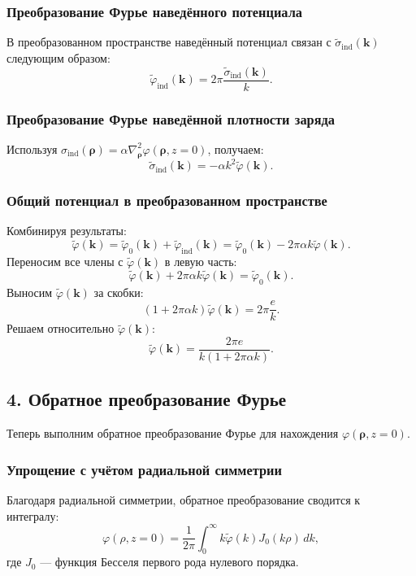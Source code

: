 \documentclass{article}
\begin{document}
\subsubsection*{Преобразование Фурье наведённого потенциала}

В преобразованном пространстве наведённый потенциал связан с \( \tilde{\sigma}_{\text{ind}}(\bm{k}) \) следующим образом:
\[
\tilde{\varphi}_{\text{ind}}(\bm{k}) = 2\pi \frac{\tilde{\sigma}_{\text{ind}}(\bm{k})}{k}.
\]

\subsubsection*{Преобразование Фурье наведённой плотности заряда}

Используя \( \sigma_{\text{ind}}(\bm{\rho}) = \alpha \nabla_{\bm{\rho}}^2 \varphi(\bm{\rho}, z = 0) \), получаем:
\[
\tilde{\sigma}_{\text{ind}}(\bm{k}) = -\alpha k^2 \tilde{\varphi}(\bm{k}).
\]

\subsubsection*{Общий потенциал в преобразованном пространстве}

Комбинируя результаты:
\[
\tilde{\varphi}(\bm{k}) = \tilde{\varphi}_0(\bm{k}) + \tilde{\varphi}_{\text{ind}}(\bm{k}) = \tilde{\varphi}_0(\bm{k}) - 2\pi \alpha k \tilde{\varphi}(\bm{k}).
\]
Переносим все члены с \( \tilde{\varphi}(\bm{k}) \) в левую часть:
\[
\tilde{\varphi}(\bm{k}) + 2\pi \alpha k \tilde{\varphi}(\bm{k}) = \tilde{\varphi}_0(\bm{k}).
\]
Выносим \( \tilde{\varphi}(\bm{k}) \) за скобки:
\[
\left(1 + 2\pi \alpha k\right) \tilde{\varphi}(\bm{k}) = 2\pi \frac{e}{k}.
\]
Решаем относительно \( \tilde{\varphi}(\bm{k}) \):
\[
\tilde{\varphi}(\bm{k}) = \frac{2\pi e}{k \left(1 + 2\pi \alpha k\right)}.
\]

\subsection*{4. Обратное преобразование Фурье}

Теперь выполним обратное преобразование Фурье для нахождения \( \varphi(\bm{\rho}, z = 0) \).

\subsubsection*{Упрощение с учётом радиальной симметрии}

Благодаря радиальной симметрии, обратное преобразование сводится к интегралу:
\[
\varphi(\rho, z = 0) = \frac{1}{2\pi} \int_0^\infty k \tilde{\varphi}(k) J_0(k \rho) \, dk,
\]
где \( J_0 \) — функция Бесселя первого рода нулевого порядка.
\end{document}

